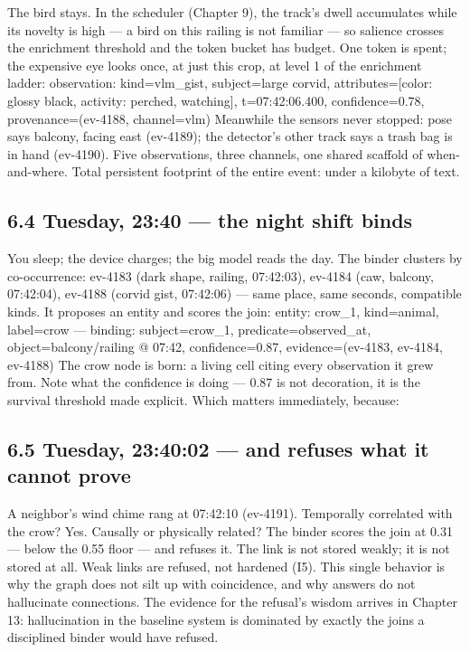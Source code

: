 The bird stays. In the scheduler (Chapter 9), the track's dwell accumulates while its novelty is high --- a bird on this railing is not familiar --- so salience crosses the enrichment threshold and the token bucket has budget. One token is spent; the expensive eye looks once, at just this crop, at level 1 of the enrichment ladder: observation: kind=vlm\_gist, subject=large corvid, attributes={[}color: glossy black, activity: perched, watching{]}, t=07:42:06.400, confidence=0.78, provenance=(ev-4188, channel=vlm) Meanwhile the sensors never stopped: pose says balcony, facing east (ev-4189); the detector's other track says a trash bag is in hand (ev-4190). Five observations, three channels, one shared scaffold of when-and-where. Total persistent footprint of the entire event: under a kilobyte of text.

\subsection{6.4 Tuesday, 23:40 --- the night shift binds}\label{tuesday-2340-the-night-shift-binds}

You sleep; the device charges; the big model reads the day. The binder clusters by co-occurrence: ev-4183 (dark shape, railing, 07:42:03), ev-4184 (caw, balcony, 07:42:04), ev-4188 (corvid gist, 07:42:06) --- same place, same seconds, compatible kinds. It proposes an entity and scores the join: entity: crow\_1, kind=animal, label=crow --- binding: subject=crow\_1, predicate=observed\_at, object=balcony/railing @ 07:42, confidence=0.87, evidence=(ev-4183, ev-4184, ev-4188) The crow node is born: a living cell citing every observation it grew from. Note what the confidence is doing --- 0.87 is not decoration, it is the survival threshold made explicit. Which matters immediately, because:

\subsection{6.5 Tuesday, 23:40:02 --- and refuses what it cannot prove}\label{tuesday-234002-and-refuses-what-it-cannot-prove}

A neighbor's wind chime rang at 07:42:10 (ev-4191). Temporally correlated with the crow? Yes. Causally or physically related? The binder scores the join at 0.31 --- below the 0.55 floor --- and refuses it. The link is not stored weakly; it is not stored at all. Weak links are refused, not hardened (I5). This single behavior is why the graph does not silt up with coincidence, and why answers do not hallucinate connections. The evidence for the refusal's wisdom arrives in Chapter 13: hallucination in the baseline system is dominated by exactly the joins a disciplined binder would have refused.

